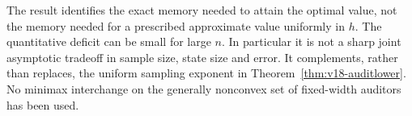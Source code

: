 The result identifies the exact memory needed to attain the optimal value,
not the memory needed for a prescribed approximate value uniformly in $h$.
The quantitative deficit can be small for large $n$. In particular it is
not a sharp joint asymptotic tradeoff in sample size, state size and error.
It complements, rather than replaces, the uniform sampling exponent in
Theorem~\ref{thm:v18-auditlower}. No minimax interchange on the generally
nonconvex set of fixed-width auditors has been used.
